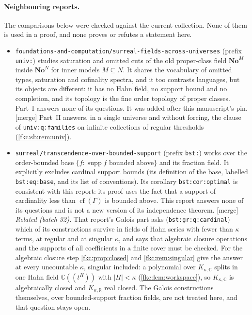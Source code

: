 \documentclass[11pt,letterpaper]{article}
\numberwithin{equation}{section}
\theoremstyle{definition}
\theoremstyle{remark}
\newcommand{\R}{\mathbb R}
\newcommand{\C}{\mathbb C}
\newcommand{\No}{\mathbf{No}}
\newcommand{\supp}{\operatorname{supp}}
\newcommand{\cf}{\operatorname{cf}}
\newcommand{\mergetag}{\textup{\textsf{\small[merge]}}}%
\newcommand{\card}[1]{\lvert #1\rvert}
\begin{document}
\paragraph{Neighbouring reports.}
The comparisons below were checked against the current collection. None of them is used in a proof, and none proves or refutes a statement here.
\begin{itemize}
\item \texttt{foundations-and-computation/surreal-fields-across-universes} (prefix \texttt{univ:}) \cite{CollUniv} studies saturation and omitted cuts of the old proper-class field $\No^M$ inside $\No^N$ for inner models $M\subseteq N$. It shares the vocabulary of omitted types, saturation and cofinality spectra, and it too contrasts languages, but its objects are different: it has no Hahn field, no support bound and no completion, and its topology is the fine order topology of proper classes. Part~I answers none of its questions. It was added after this manuscript's pin. \mergetag{} Part~II answers, in a single universe and without forcing, the clause of \texttt{univ:q:families} on infinite collections of regular thresholds (\cref{fkc:sb:rem:univ}).
\item \texttt{surreal/transcendence-over-bounded-support} (prefix \texttt{bst:}) \cite{CollBST} works over the order-bounded base $\{f:\supp f\text{ bounded above}\}$ and its fraction field. It explicitly excludes cardinal support bounds (its definition of the base, labelled \texttt{bst:eq:base}, and its list of conventions). Its corollary \texttt{bst:cor:optimal} is consistent with this report: its proof uses the fact that a support of cardinality less than $\cf(\Gamma)$ is bounded above. This report answers none of its questions and is not a new version of its independence theorem. \mergetag{} \emph{Related (batch 32).} That report's Galois part asks (\texttt{bst:gr:q:cardinal}) which of its constructions survive in fields of Hahn series with fewer than $\kappa$ terms, at regular and at singular $\kappa$, and says that algebraic closure operations and the supports of all coefficients in a finite cover must be checked. For the algebraic closure step \cref{fkc:prop:closed} and \cref{fkc:rem:singular} give the answer at every uncountable $\kappa$, singular included: a polynomial over $K_{\kappa,\C}$ splits in one Hahn field $\C((t^H))$ with $\card H<\kappa$ (\cref{fkc:lem:workspace}), so $K_{\kappa,\C}$ is algebraically closed and $K_{\kappa,\R}$ real closed. The Galois constructions themselves, over bounded-support fraction fields, are not treated here, and that question stays open.

\end{itemize}
\end{document}
